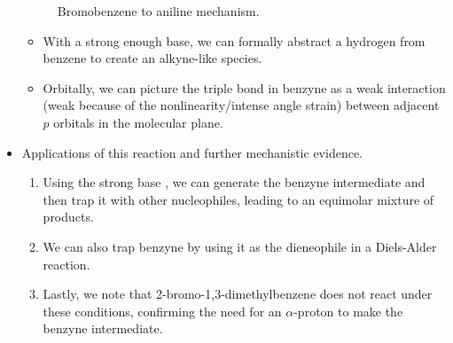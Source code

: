 \documentclass[../notes.tex]{subfiles}
\begin{document}
\begin{itemize}
\begin{figure}[h!]
        \caption{Bromobenzene to aniline mechanism.}
        \label{fig:PhBrtoPhNH2}
    \end{figure}
    \begin{itemize}
        \item With a strong enough base, we can formally abstract a hydrogen from benzene to create an alkyne-like species.
        \item Orbitally, we can picture the triple bond in benzyne as a weak interaction (weak because of the nonlinearity/intense angle strain) between adjacent $p$ orbitals in the molecular plane.
    \end{itemize}
    \item Applications of this reaction and further mechanistic evidence.
    \begin{enumerate}
        \item Using the strong base , we can generate the benzyne intermediate and then trap it with other nucleophiles, leading to an equimolar mixture of products.
        \item We can also trap benzyne by using it as the dieneophile in a Diels-Alder reaction.
        \item Lastly, we note that 2-bromo-1,3-dimethylbenzene does not react under these conditions, confirming the need for an $\alpha$-proton to make the benzyne intermediate.
    \end{enumerate}
\end{itemize}
\end{document}
